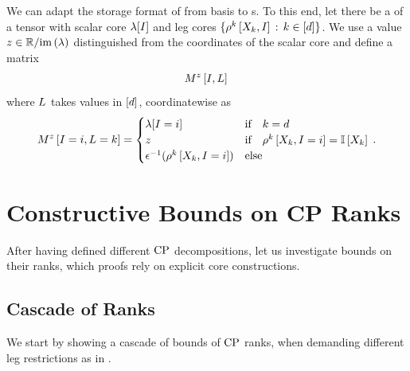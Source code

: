 \begin{remark}
    \label{rem:matStorageBasPlus}
    We can adapt the storage format of  from basis to \basplusDecomposition{}s.
    To this end, let there be a \basplusDecomposition{} of a tensor with scalar core $\lambda[I]$ and leg cores $\{\rho^{k}\left[X_{k},I\right] \,:\, k\in[d]\}$.
    We use a value $z\in\mathbb{R}/\mathrm{im}\left(\lambda\right)$ distinguished from the coordinates of the scalar core and define a matrix
    \begin{align*}
        M^{z}\left[I,L\right] \,
    \end{align*}
    where $L$ takes values in $[d]$, coordinatewise as
    \begin{align*}
        M^{z}\left[I=i,L=k\right] =
        \begin{cases}
            \lambda[I=i] & \text{if}\quad k = d \\
            z & \text{if}\quad \rho^{k}\left[X_{k},I=i\right] = \mathbb{I}\left[X_{k}\right] \\
            \epsilon^{-1}(\rho^{k}\left[X_{k},I=i\right]) & \text{else}
        \end{cases} \, .
    \end{align*}
\end{remark}



\section{Constructive Bounds on CP Ranks}

After having defined different $\mathrm{CP}$ decompositions, let us investigate bounds on their ranks, which proofs rely on explicit core constructions.


\subsection{Cascade of Ranks}


We start by showing a cascade of bounds of $\mathrm{CP}$ ranks, when demanding different leg restrictions as in .


